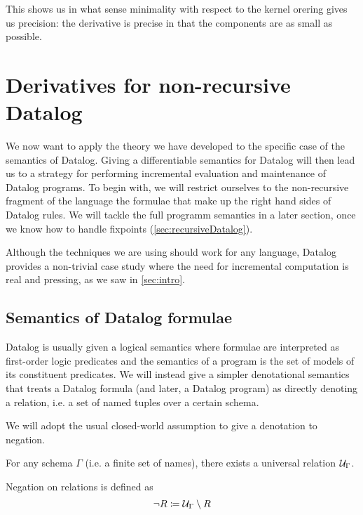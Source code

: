 This shows us in what sense minimality with respect to the kernel orering gives
us precision: the derivative is precise in that the components are as small as
possible.

\section{Derivatives for non-recursive Datalog}
\label{sec:nonRecursiveDatalog}


We now want to apply the theory we have developed to the specific case of the semantics
of Datalog. Giving a differentiable semantics for Datalog will then
lead us to a strategy for performing incremental evaluation and maintenance of Datalog programs. 
To begin with, we will restrict ourselves to the non-recursive fragment of the
language \textemdash{} the formulae that make up the right hand sides of Datalog
rules. We will tackle the full programm semantics in a later section, once we
know how to handle fixpoints (\cref{sec:recursiveDatalog}).

Although the techniques we are using should work for any language, Datalog
provides a non-trivial case study where the need for incremental computation is
real and pressing, as we saw in \cref{sec:intro}.

\subsection{Semantics of Datalog formulae}

Datalog is usually given a logical semantics where formulae are interpreted as first-order
logic predicates and the semantics of a program is the set of models of its constituent
predicates. We will instead give a simpler denotational semantics that treats a Datalog
formula (and later, a Datalog program) as directly denoting a relation, i.e.
a set of named tuples over a certain schema.

We will adopt the usual closed-world assumption to give a denotation to negation.

\begin{defn}
  For any schema $\Gamma$ (i.e. a finite set of names),
  there exists a universal relation $\mathcal{U}_\Gamma$.

  Negation on relations is defined as
  \begin{displaymath}
    \neg R \coloneqq \mathcal{U}_\Gamma \setminus R
  \end{displaymath}
\end{defn}


